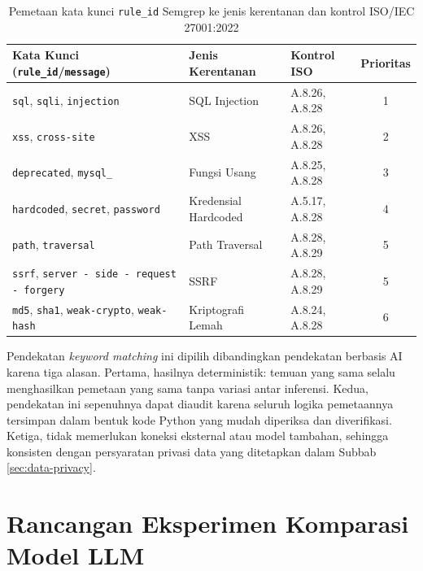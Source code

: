 \begin{table}[htbp]
\caption{Pemetaan kata kunci \texttt{rule\_id} Semgrep ke jenis
kerentanan dan kontrol ISO/IEC 27001:2022}
\vspace{0.5em}
\centering
\label{tab:keyword-mapping}
\renewcommand{\arraystretch}{1.6}
\begin{tabularx}{\textwidth}{|>{\raggedright\arraybackslash}X|l|l|c|}
\hline
\textbf{Kata Kunci (\texttt{rule\_id}/\texttt{message})} &
\textbf{Jenis Kerentanan} &
\textbf{Kontrol ISO} &
\textbf{Prioritas} \\
\hline \hline
\texttt{sql}, \texttt{sqli}, \texttt{injection} &
SQL Injection & A.8.26, A.8.28 & 1 \\
\hline
\texttt{xss}, \texttt{cross-site} &
XSS & A.8.26, A.8.28 & 2 \\
\hline
\texttt{deprecated}, \texttt{mysql\_} &
Fungsi Usang & A.8.25, A.8.28 & 3 \\
\hline
\texttt{hardcoded}, \texttt{secret}, \texttt{password} &
Kredensial Hardcoded & A.5.17, A.8.28 & 4 \\
\hline
\texttt{path}, \texttt{traversal} &
Path Traversal & A.8.28, A.8.29 & 5 \\
\hline
\texttt{ssrf}, \texttt{server - side - request - forgery} &
SSRF & A.8.28, A.8.29 & 5 \\
\hline
\texttt{md5}, \texttt{sha1}, \texttt{weak-crypto}, \texttt{weak-hash} &
Kriptografi Lemah & A.8.24, A.8.28 & 6 \\
\hline
\end{tabularx}
\end{table}
Pendekatan \textit{keyword matching} ini dipilih dibandingkan pendekatan berbasis AI karena tiga alasan. Pertama,
hasilnya deterministik: temuan yang sama selalu menghasilkan
pemetaan yang sama tanpa variasi antar inferensi. Kedua, pendekatan ini 
sepenuhnya dapat diaudit karena seluruh logika pemetaannya tersimpan 
dalam bentuk kode Python yang mudah diperiksa dan diverifikasi.
Ketiga, tidak memerlukan koneksi eksternal atau model tambahan,
sehingga konsisten dengan persyaratan privasi data yang ditetapkan
dalam Subbab \ref{sec:data-privacy}.
\newpage
\section{Rancangan Eksperimen Komparasi Model LLM}

